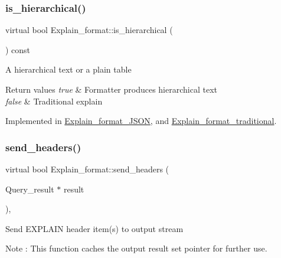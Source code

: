 \subsubsection{\texorpdfstring{is\+\_\+hierarchical()}{is\_hierarchical()}}
{\footnotesize\ttfamily virtual bool Explain\+\_\+format\+::is\+\_\+hierarchical (\begin{DoxyParamCaption}{ }\end{DoxyParamCaption}) const\hspace{0.3cm}{\ttfamily [pure virtual]}}

A hierarchical text or a plain table


\begin{DoxyRetVals}{Return values}
{\em true} & Formatter produces hierarchical text \\
\hline
{\em false} & Traditional explain \\
\hline
\end{DoxyRetVals}


Implemented in \mbox{\hyperlink{classExplain__format__JSON_a5df8ad340d44c6d184be5f6397ab8d99}{Explain\+\_\+format\+\_\+\+J\+S\+ON}}, and \mbox{\hyperlink{classExplain__format__traditional_a8861c3fd3ab2ed3523a0c1fcaa172645}{Explain\+\_\+format\+\_\+traditional}}.

\mbox{\label{classExplain__format_ae4808c82b9c88d94ede33477753917f3}} 
\subsubsection{\texorpdfstring{send\+\_\+headers()}{send\_headers()}}
{\footnotesize\ttfamily virtual bool Explain\+\_\+format\+::send\+\_\+headers (\begin{DoxyParamCaption}\item[{Query\+\_\+result $\ast$}]{result }\end{DoxyParamCaption})\hspace{0.3cm}{\ttfamily [inline]}, {\ttfamily [virtual]}}

Send E\+X\+P\+L\+A\+IN header item(s) to output stream

\begin{DoxyNote}{Note}
\+: This function caches the output result set pointer for further use.
\end{DoxyNote}

